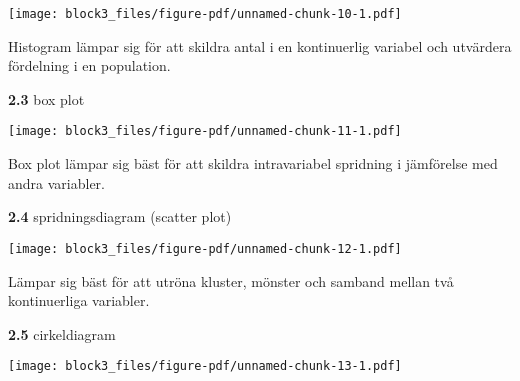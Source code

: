 \documentclass[
  letterpaper,
  DIV=11,
  numbers=noendperiod]{scrartcl}
\newenvironment{Shaded}{\begin{snugshade}}{\end{snugshade}}
\newcommand{\FunctionTok}[1]{\textcolor[rgb]{0.28,0.35,0.67}{#1}}
\newcommand{\NormalTok}[1]{\textcolor[rgb]{0.00,0.23,0.31}{#1}}
\newcommand{\SpecialCharTok}[1]{\textcolor[rgb]{0.37,0.37,0.37}{#1}}
\begin{document}
\begin{Shaded}
\end{Shaded}

\texttt{[image: block3\_files/figure-pdf/unnamed-chunk-10-1.pdf]}

Histogram lämpar sig för att skildra antal i en kontinuerlig variabel
och utvärdera fördelning i en population.

\textbf{2.3} box plot

\begin{Shaded}
\end{Shaded}

\texttt{[image: block3\_files/figure-pdf/unnamed-chunk-11-1.pdf]}

Box plot lämpar sig bäst för att skildra intravariabel spridning i
jämförelse med andra variabler.

\textbf{2.4} spridningsdiagram (scatter plot)

\begin{Shaded}
\end{Shaded}

\texttt{[image: block3\_files/figure-pdf/unnamed-chunk-12-1.pdf]}

Lämpar sig bäst för att utröna kluster, mönster och samband mellan två
kontinuerliga variabler.

\textbf{2.5} cirkeldiagram

\begin{Shaded}
\end{Shaded}

\texttt{[image: block3\_files/figure-pdf/unnamed-chunk-13-1.pdf]}
\end{document}

